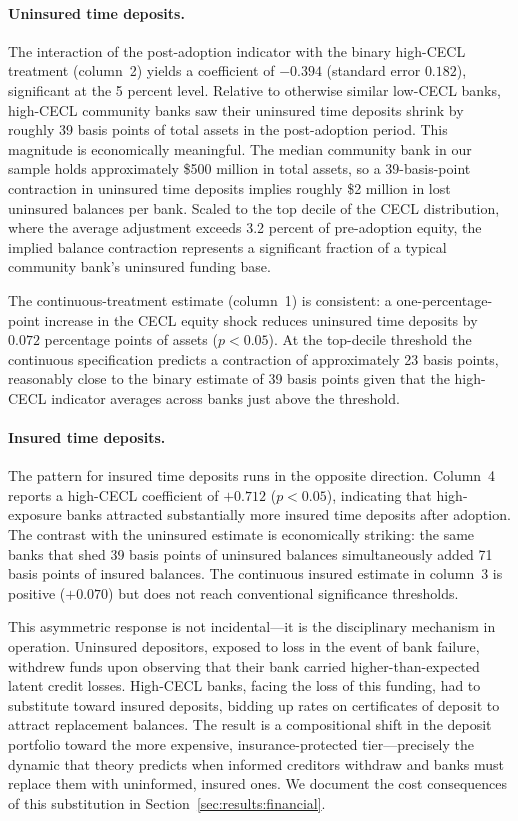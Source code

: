 \paragraph{Uninsured time deposits.}
The interaction of the post-adoption indicator with the binary high-CECL treatment
(column~2) yields a coefficient of $-0.394$ (standard error $0.182$), significant
at the 5 percent level.  Relative to otherwise similar low-CECL banks, high-CECL
community banks saw their uninsured time deposits shrink by roughly 39 basis
points of total assets in the post-adoption period.  This magnitude is
economically meaningful.  The median community bank in our sample holds
approximately \$500 million in total assets, so a 39-basis-point contraction in
uninsured time deposits implies roughly \$2 million in lost uninsured balances per
bank.  Scaled to the top decile of the CECL distribution, where the average
adjustment exceeds 3.2 percent of pre-adoption equity, the implied balance
contraction represents a significant fraction of a typical community bank's
uninsured funding base.

The continuous-treatment estimate (column~1) is consistent: a
one-percentage-point increase in the CECL equity shock reduces uninsured time
deposits by $0.072$ percentage points of assets ($p < 0.05$).  At the top-decile
threshold the continuous specification predicts a contraction of approximately 23
basis points, reasonably close to the binary estimate of 39 basis points given
that the high-CECL indicator averages across banks just above the threshold.

\paragraph{Insured time deposits.}
The pattern for insured time deposits runs in the opposite direction.  Column~4
reports a high-CECL coefficient of $+0.712$ ($p < 0.05$), indicating that
high-exposure banks attracted substantially more insured time deposits after
adoption.  The contrast with the uninsured estimate is economically striking: the
same banks that shed 39 basis points of uninsured balances simultaneously added
71 basis points of insured balances.  The continuous insured estimate in column~3
is positive ($+0.070$) but does not reach conventional significance thresholds.

This asymmetric response is not incidental---it is the disciplinary mechanism in
operation.  Uninsured depositors, exposed to loss in the event of bank failure,
withdrew funds upon observing that their bank carried higher-than-expected latent
credit losses.  High-CECL banks, facing the loss of this funding, had to
substitute toward insured deposits, bidding up rates on certificates of deposit to
attract replacement balances.  The result is a compositional shift in the deposit
portfolio toward the more expensive, insurance-protected tier---precisely the
dynamic that theory predicts when informed creditors withdraw and banks must
replace them with uninformed, insured ones.  We document the cost consequences of
this substitution in Section~\ref{sec:results:financial}.


